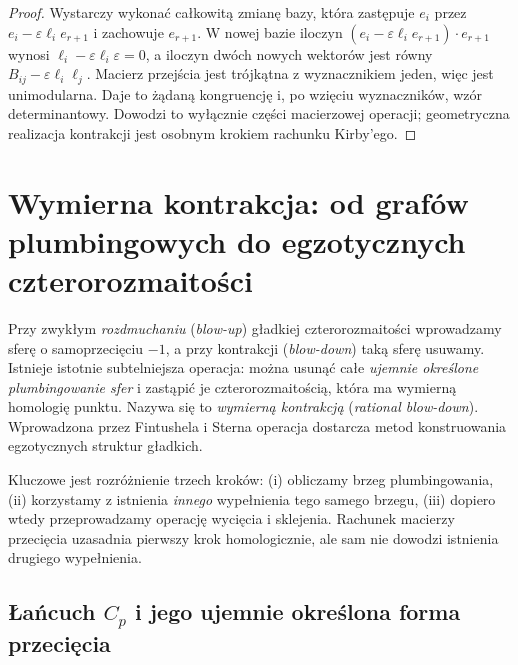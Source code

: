\begin{proof}
Wystarczy wykonać całkowitą zmianę bazy, która zastępuje
$e_i$ przez $e_i-\varepsilon\ell_i e_{r+1}$ i zachowuje
$e_{r+1}$. W nowej bazie iloczyn
$(e_i-\varepsilon\ell_i e_{r+1})\cdot e_{r+1}$
wynosi $\ell_i-\varepsilon\ell_i\varepsilon=0$,
a iloczyn dwóch nowych wektorów jest równy
$B_{ij}-\varepsilon\ell_i\ell_j$.
Macierz przejścia jest trójkątna z wyznacznikiem jeden,
więc jest unimodularna. Daje to żądaną kongruencję
i, po wzięciu wyznaczników, wzór determinantowy.
Dowodzi to wyłącznie części macierzowej operacji;
geometryczna realizacja kontrakcji jest osobnym krokiem
rachunku Kirby'ego.
\end{proof}

\chapter{Wymierna kontrakcja: od grafów plumbingowych do egzotycznych czterorozmaitości}
\label{ch:tg-rational-blowdown}

Przy zwykłym \emph{rozdmuchaniu} (\emph{blow-up}) gładkiej
czterorozmaitości wprowadzamy sferę o samoprzecięciu $-1$,
a przy kontrakcji (\emph{blow-down}) taką sferę usuwamy.
Istnieje istotnie subtelniejsza operacja: można usunąć całe
\emph{ujemnie określone plumbingowanie sfer} i zastąpić je
czterorozmaitością, która ma wymierną homologię punktu.
Nazywa się to \emph{wymierną kontrakcją} (\emph{rational
blow-down}). Wprowadzona przez Fintushela i Sterna operacja
dostarcza metod konstruowania egzotycznych struktur gładkich.

Kluczowe jest rozróżnienie trzech kroków: (i) obliczamy brzeg
plumbingowania, (ii) korzystamy z istnienia \emph{innego}
wypełnienia tego samego brzegu, (iii) dopiero wtedy
przeprowadzamy operację wycięcia i sklejenia. Rachunek
macierzy przecięcia uzasadnia pierwszy krok homologicznie,
ale sam nie dowodzi istnienia drugiego wypełnienia.

\section{Łańcuch \texorpdfstring{$C_p$}{Cp} i jego ujemnie określona forma przecięcia}
\label{sec:tg-rb-config}

